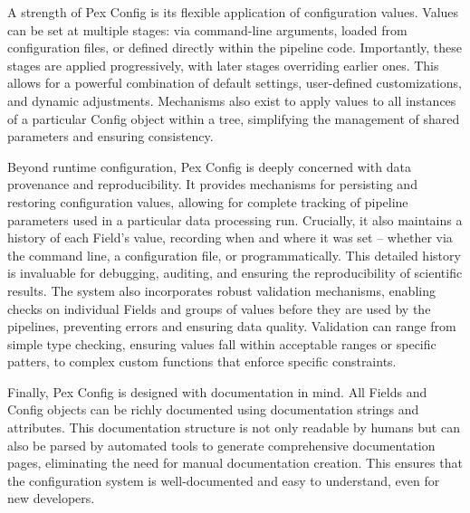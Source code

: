 A strength of Pex Config is its flexible application of configuration values.
Values can be set at multiple stages: via command-line arguments, loaded from configuration files, or defined directly within the pipeline code.
Importantly, these stages are applied progressively, with later stages overriding earlier ones.
This allows for a powerful combination of default settings, user-defined customizations, and dynamic adjustments.
Mechanisms also exist to apply values to all instances of a particular Config object within a tree, simplifying the management of shared parameters and ensuring consistency.


Beyond runtime configuration, Pex Config is deeply concerned with data provenance and reproducibility.
It provides mechanisms for persisting and restoring configuration values, allowing for complete tracking of pipeline parameters used in a particular data processing run.
Crucially, it also maintains a history of each Field's value, recording when and where it was set -- whether via the command line, a configuration file, or programmatically.
This detailed history is invaluable for debugging, auditing, and ensuring the reproducibility of scientific results.
The system also incorporates robust validation mechanisms, enabling checks on individual Fields and groups of values before they are used by the pipelines, preventing errors and ensuring data quality.
Validation can range from simple type checking, ensuring values fall within acceptable ranges or specific patters, to complex custom functions that enforce specific constraints.


Finally, Pex Config is designed with documentation in mind.
All Fields and Config objects can be richly documented using documentation strings and attributes.
This documentation structure is not only readable by humans but can also be parsed by automated tools to generate comprehensive documentation pages, eliminating the need for manual documentation creation.
This ensures that the configuration system is well-documented and easy to understand, even for new developers.
